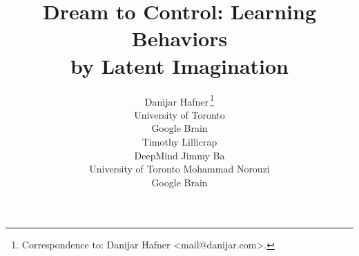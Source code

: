 \documentclass{article}
\title{\vspace*{-2ex}Dream to Control: Learning Behaviors\\by Latent Imagination}
\author{%
Danijar Hafner\,\thanks{Correspondence to: Danijar Hafner <mail@danijar.com>.} \\
University of Toronto \\
Google Brain \\
\And
Timothy Lillicrap \\
DeepMind
\And
Jimmy Ba \\
University of Toronto
\And
Mohammad Norouzi \\
Google Brain}
\begin{document}
\maketitle

\vspace*{-5ex}
\begin{abstract}

\end{abstract}






\vspace*{5ex}
\pagebreak




\clearpage


\clearpage
\appendix
\raggedbottom

\end{document}
